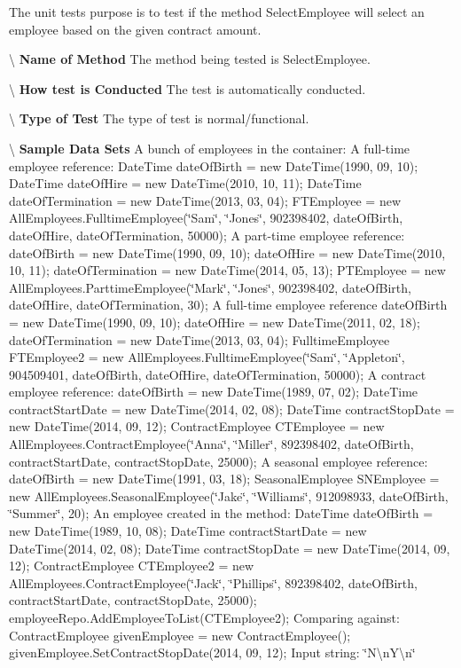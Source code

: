 The unit test\textquotesingle{}s purpose is to test if the method Select\+Employee will select an employee based on the given contract amount. 

\textbackslash{} {\bfseries  Name of Method} The method being tested is Select\+Employee.

\textbackslash{} {\bfseries  How test is Conducted} The test is automatically conducted.

\textbackslash{} {\bfseries  Type of Test} The type of test is normal/functional.

\textbackslash{} {\bfseries  Sample Data Sets} A bunch of employees in the container\+: A full-\/time employee reference\+: Date\+Time date\+Of\+Birth = new Date\+Time(1990, 09, 10); Date\+Time date\+Of\+Hire = new Date\+Time(2010, 10, 11); Date\+Time date\+Of\+Termination = new Date\+Time(2013, 03, 04); F\+T\+Employee = new All\+Employees.\+Fulltime\+Employee(\char`\"{}\+Sam\char`\"{}, \char`\"{}\+Jones\char`\"{}, 902398402, date\+Of\+Birth, date\+Of\+Hire, date\+Of\+Termination, 50000); A part-\/time employee reference\+: date\+Of\+Birth = new Date\+Time(1990, 09, 10); date\+Of\+Hire = new Date\+Time(2010, 10, 11); date\+Of\+Termination = new Date\+Time(2014, 05, 13); P\+T\+Employee = new All\+Employees.\+Parttime\+Employee(\char`\"{}\+Mark\char`\"{}, \char`\"{}\+Jones\char`\"{}, 902398402, date\+Of\+Birth, date\+Of\+Hire, date\+Of\+Termination, 30); A full-\/time employee reference date\+Of\+Birth = new Date\+Time(1990, 09, 10); date\+Of\+Hire = new Date\+Time(2011, 02, 18); date\+Of\+Termination = new Date\+Time(2013, 03, 04); Fulltime\+Employee F\+T\+Employee2 = new All\+Employees.\+Fulltime\+Employee(\char`\"{}\+Sam\char`\"{}, \char`\"{}\+Appleton\char`\"{}, 904509401, date\+Of\+Birth, date\+Of\+Hire, date\+Of\+Termination, 50000); A contract employee reference\+: date\+Of\+Birth = new Date\+Time(1989, 07, 02); Date\+Time contract\+Start\+Date = new Date\+Time(2014, 02, 08); Date\+Time contract\+Stop\+Date = new Date\+Time(2014, 09, 12); Contract\+Employee C\+T\+Employee = new All\+Employees.\+Contract\+Employee(\char`\"{}\+Anna\char`\"{}, \char`\"{}\+Miller\char`\"{}, 892398402, date\+Of\+Birth, contract\+Start\+Date, contract\+Stop\+Date, 25000); A seasonal employee reference\+: date\+Of\+Birth = new Date\+Time(1991, 03, 18); Seasonal\+Employee S\+N\+Employee = new All\+Employees.\+Seasonal\+Employee(\char`\"{}\+Jake\char`\"{}, \char`\"{}\+Williams\char`\"{}, 912098933, date\+Of\+Birth, \char`\"{}\+Summer\char`\"{}, 20); An employee created in the method\+: Date\+Time date\+Of\+Birth = new Date\+Time(1989, 10, 08); Date\+Time contract\+Start\+Date = new Date\+Time(2014, 02, 08); Date\+Time contract\+Stop\+Date = new Date\+Time(2014, 09, 12); Contract\+Employee C\+T\+Employee2 = new All\+Employees.\+Contract\+Employee(\char`\"{}\+Jack\char`\"{}, \char`\"{}\+Phillips\char`\"{}, 892398402, date\+Of\+Birth, contract\+Start\+Date, contract\+Stop\+Date, 25000); employee\+Repo.\+Add\+Employee\+To\+List(\+C\+T\+Employee2); Comparing against\+: Contract\+Employee given\+Employee = new Contract\+Employee(); given\+Employee.\+Set\+Contract\+Stop\+Date(2014, 09, 12); Input string\+: \char`\"{}\+N\textbackslash{}n\+Y\textbackslash{}n\char`\"{}


